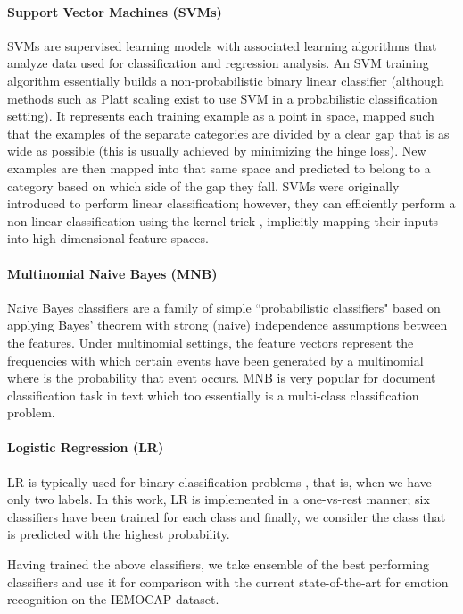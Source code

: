 \documentclass[conference]{IEEEtran}
\begin{document}
\paragraph{Support Vector Machines (SVMs)} SVMs are supervised learning models with associated learning algorithms that analyze data used for classification and regression analysis. An SVM training algorithm essentially builds a non-probabilistic binary linear classifier (although methods such as Platt scaling \cite{platt1999probabilistic} exist to use SVM in a probabilistic classification setting). It represents each training example as a point in space, mapped such that the examples of the separate categories are divided by a clear gap that is as wide as possible (this is usually achieved by minimizing the hinge loss). New examples are then mapped into that same space and predicted to belong to a category based on which side of the gap they fall. SVMs were originally introduced to perform linear classification; however, they can efficiently perform a non-linear classification using the kernel trick \cite{cortes1995support}, implicitly mapping their inputs into high-dimensional feature spaces.
\paragraph{Multinomial Naive Bayes (MNB)} Naive Bayes classifiers are a family of simple ``probabilistic classifiers" based on applying Bayes' theorem with strong (naive) independence assumptions between the features. Under multinomial settings, the feature vectors represent the frequencies with which certain events have been generated by a multinomial  where  is the probability that event  occurs. MNB is very popular for document classification task in text \cite{kibriya2004multinomial} which too essentially is a multi-class classification problem.
\paragraph{Logistic Regression (LR)} LR is typically used for binary classification problems \cite{king2001logistic}, that is, when we have only two labels. In this work, LR is implemented in a one-vs-rest manner; six classifiers have been trained for each class and finally, we consider the class that is predicted with the highest probability.

Having trained the above classifiers, we take ensemble of the best performing classifiers and use it for comparison with the current state-of-the-art for emotion recognition on the IEMOCAP dataset.
\end{document}
